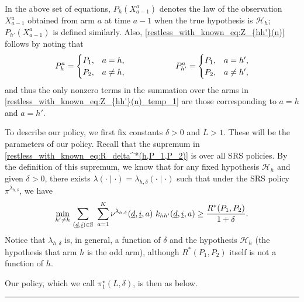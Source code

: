 {\color{black} In the above set of equations, $P_h(X_{a-1}^a)$ denotes the law of the observation $X_{a-1}^a$ obtained from arm $a$ at time $a-1$ when the true hypothesis is $\mathcal{H}_h$; $P_{h'}(X_{a-1}^a)$ is defined similarly. Also, \eqref{restless_with_known_eq:Z_{hh'}(n)} follows by noting that 
\begin{equation}
P_h^a = \begin{cases}
P_1, &a=h,\\
P_2, &a\neq h,
\end{cases} \qquad \qquad \qquad  P_{h'}^a = \begin{cases}
P_1, &a=h',\\
P_2, &a\neq h', \label{restless_with_known_eq:P_h^a_and_P_{h'}^a}
\end{cases}
\end{equation}
and thus the only nonzero terms in the summation over the arms in \eqref{restless_with_known_eq:Z_{hh'}(n)_temp_1} are those corresponding to $a=h$ and $a=h'$.}

To describe our policy, we first fix constants $\delta>0$ and $L>1$. These will be the parameters of our policy. Recall that the supremum in \eqref{restless_with_known_eq:R_delta^*(h,P_1,P_2)} is over all SRS policies. By the definition of this supremum, we know that for any fixed hypothesis $\mathcal{H}_h$ and given $\delta>0$, there exists $\lambda(\cdot\mid\cdot)=\lambda_{h, \delta}(\cdot\mid\cdot)$ such that under the SRS policy $\pi^{\lambda_{h, \delta}}$, we have\begin{equation}
	\min\limits_{h'\neq h}\,\sum\limits_{(\underline{d},\underline{i})\in\mathbb{S}}~\sum\limits_{a=1}^{K} \nu^{\lambda_{h,\delta}}(\underline{d},\underline{i},a)\, \,\textcolor{black}{k_{hh'}(\underline{d}, \underline{i}, a)} \geq \frac{R^*(P_1,P_2)}{1+\delta}.\label{restless_with_known_eq:policy_exists}
\end{equation}
Notice that $\lambda_{h, \delta}$ is, in general, a function of $\delta$ and the hypothesis $\mathcal{H}_h$ (the hypothesis that arm $h$ is the odd arm), although $R^*(P_1,P_2)$ itself is not a function of $h$. 

Our policy, which we call $\pi_1^\star(L,\delta)$, is then as below.
\vspace{.1in}
\hrule

\vspace{.1in}

